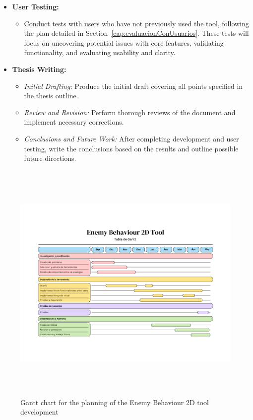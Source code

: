 \begin{itemize}
  \item \textbf{User Testing:}
    \begin{itemize}
      \item Conduct tests with users who have not previously used the tool, following the plan detailed in Section~\ref{cap:evaluacionConUsuarios}. These tests will focus on uncovering potential issues with core features, validating functionality, and evaluating usability and clarity.
    \end{itemize}

  \item \textbf{Thesis Writing:}
    \begin{itemize}
      \item \emph{Initial Drafting:} Produce the initial draft covering all points specified in the thesis outline.
      \item \emph{Review and Revision:} Perform thorough reviews of the document and implement necessary corrections.
      \item \emph{Conclusions and Future Work:} After completing development and user testing, write the conclusions based on the results and outline possible future directions.
    \end{itemize}
\end{itemize}

\begin{figure}[h!]
  \centering
  \includegraphics[height=12cm]{Imagenes/GanttChart}
  \caption{Gantt chart for the planning of the Enemy Behaviour 2D tool development}
  \label{fig:GanttEnemyBehaviour2D}
\end{figure}
